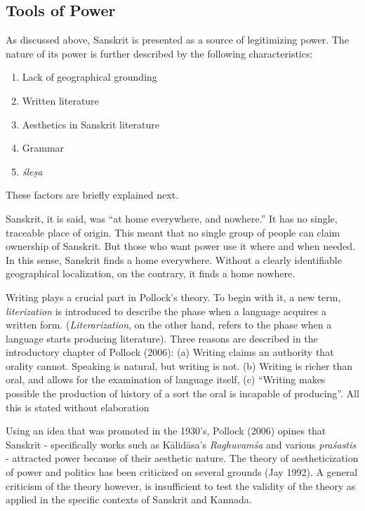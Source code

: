 \subsection{Tools of Power}

As discussed above, Sanskrit is presented as a source of legitimizing power. The nature of its power is further described by the following characteristics:
\begin{enumerate}
\itemsep=0pt
\item Lack of geographical grounding
\item Written literature
\item Aesthetics in Sanskrit literature
\item Grammar
\item {\sl śleṣa}
\end{enumerate}

These factors are briefly explained next. 

Sanskrit, it is said, was “at home everywhere, and nowhere.” It has no single, traceable place of origin. This meant that no single group of people can claim ownership of Sanskrit. But those who want power use it where and when needed. In this sense, Sanskrit finds a home everywhere. Without a clearly identifiable geographical localization, on the contrary, it finds a home nowhere.

Writing plays a crucial part in Pollock’s theory. To begin with it, a new term, {\sl literization} is introduced to describe the phase when a language acquires a written form. ({\sl Literarization}, on the other hand, refers to the phase when a language starts producing literature). Three reasons are described in the introductory chapter of Pollock (2006): (a) Writing claims an authority that orality cannot. Speaking is natural, but writing is not. (b) Writing is richer than oral, and allows for the examination of language itself, (c) “Writing makes possible the production of history of a sort the oral is incapable of producing”. All this is stated without elaboration

Using an idea that was promoted in the 1930’s, Pollock (2006) opines that Sanskrit - specifically works such as Kālidāsa’s {\sl Raghuvamśa} and various {\sl praśastis} - attracted power because of their aesthetic nature. The theory of aestheticization of power and politics has been criticized on several grounds (Jay 1992). A general criticism of the theory however, is insufficient to test the validity of the theory as applied in the specific contexts of Sanskrit and Kannada. 


